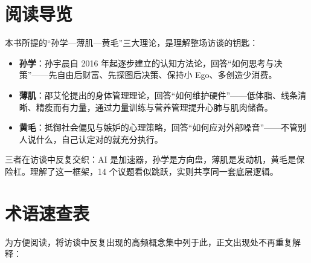 \section{阅读导览}

本书所提的``孙学---薄肌---黄毛''三大理论，是理解整场访谈的钥匙：

\begin{itemize}
\tightlist
\item
  \textbf{孙学}：孙宇晨自 2016
  年起逐步建立的认知方法论，回答``如何思考与决策''------先自由后财富、先探图后决策、保持小
  Ego、多创造少消费。
\item
  \textbf{薄肌}：邵艾伦提出的身体管理理论，回答``如何维护硬件''------低体脂、线条清晰、精瘦而有力量，通过力量训练与营养管理提升心肺与肌肉储备。
\item
  \textbf{黄毛}：抵御社会偏见与嫉妒的心理策略，回答``如何应对外部噪音''------不管别人说什么，自己认定对的就充分执行。
\end{itemize}

三者在访谈中反复交织：AI
是加速器，孙学是方向盘，薄肌是发动机，黄毛是保险杠。理解了这一框架，14
个议题看似跳跃，实则共享同一套底层逻辑。

\section{术语速查表}

为方便阅读，将访谈中反复出现的高频概念集中列于此，正文出现处不再重复解释：

